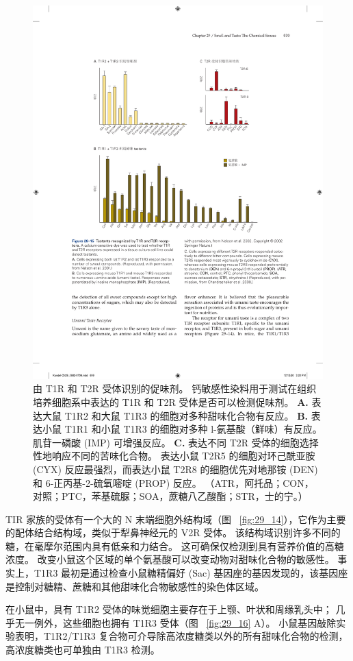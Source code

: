 \begin{figure}[htbp]
	\centering
	\includegraphics[width=0.8\linewidth]{chap29/fig_29_15}
	\caption{由 T1R 和 T2R 受体识别的促味剂。
		钙敏感性染料用于测试在组织培养细胞系中表达的 T1R 和 T2R 受体是否可以检测促味剂。
		\textbf{A.} 表达大鼠 T1R2 和大鼠 T1R3 的细胞对多种甜味化合物有反应。
		\textbf{B.} 表达小鼠 T1R1 和小鼠 T1R3 的细胞对多种 l-氨基酸（鲜味）有反应。
		肌苷一磷酸 (IMP) 可增强反应。
		\textbf{C.} 表达不同 T2R 受体的细胞选择性地响应不同的苦味化合物。
		表达小鼠 T2R5 的细胞对环己酰亚胺 (CYX) 反应最强烈，而表达小鼠 T2R8 的细胞优先对地那铵 (DEN) 和 6-正丙基-2-硫氧嘧啶 (PROP) 反应。
		（ATR，阿托品；CON，对照；PTC，苯基硫脲；SOA，蔗糖八乙酸酯；STR，士的宁。）}
	\label{fig:29_15}
\end{figure}


TIR 家族的受体有一个大的 N 末端细胞外结构域（图 ~\ref{fig:29_14}），它作为主要的配体结合结构域，类似于犁鼻神经元的 V2R 受体。
该结构域识别许多不同的糖，在毫摩尔范围内具有低亲和力结合。
这可确保仅检测到具有营养价值的高糖浓度。
改变小鼠这个区域的单个氨基酸可以改变动物对甜味化合物的敏感性。
事实上，T1R3 最初是通过检查小鼠糖精偏好 (Sac) 基因座的基因发现的，该基因座是控制对糖精、蔗糖和其他甜味化合物敏感性的染色体区域。


在小鼠中，具有 T1R2 受体的味觉细胞主要存在于上颚、叶状和周缘乳头中；
几乎无一例外，这些细胞也拥有 T1R3 受体（图 ~\ref{fig:29_16} A）。
小鼠基因敲除实验表明，T1R2/T1R3 复合物可介导除高浓度糖类以外的所有甜味化合物的检测，高浓度糖类也可单独由 T1R3 检测。


